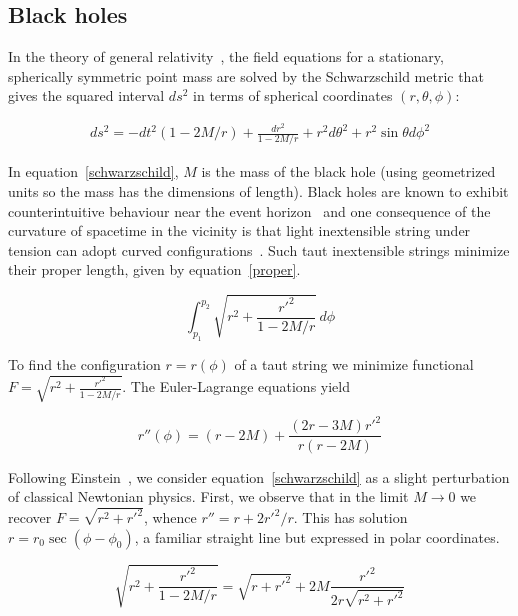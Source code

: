 \documentclass[pdflatex,sn-mathphys-num]{sn-jnl}%
\theoremstyle{thmstyleone}%
\theoremstyle{thmstyletwo}%
\theoremstyle{thmstylethree}%
\begin{document}
\subsection{Black holes}

In the theory of general relativity~\cite{misner1973}, the field
equations for a stationary, spherically symmetric point mass are
solved by the Schwarzschild metric that gives the squared interval
$ds^2$ in terms of spherical coordinates $(r,\theta,\phi)$:

\begin{eqnarray}\label{schwarzschild}
  ds^2=
  -dt^2(1-2M/r) + \frac{dr^2}{1-2M/r} + r^2d\theta^2 + r^2\sin\theta d\phi^2
  \end{eqnarray}

In equation~\ref{schwarzschild}, $M$ is the mass of the black hole
(using geometrized units so the mass has the dimensions of length).
Black holes are known to exhibit counterintuitive behaviour near the
event horizon~\cite{allen1990} and one consequence of the
curvature of spacetime in the vicinity is that light inextensible
string under tension can adopt curved
configurations~\cite{hankin2021}.  Such taut inextensible strings
minimize their proper length, given by equation~\ref{proper}.

\begin{equation}\label{proper}
  \int_{p_1}^{p_2}\sqrt{r^2 + \frac{r'^2}{1-2M/r}}\,d\phi
\end{equation}

To find the configuration $r=r(\phi)$ of a taut string we minimize
functional $F=\sqrt{r^2 + \frac{r'^2}{1-2M/r}}$.  The Euler-Lagrange
equations yield

\begin{equation}\label{eulerstring}
  r''(\phi) = (r-2M) + \frac{(2r-3M)r'^2}{r(r-2M)}
\end{equation}


Following Einstein~\cite{einstein1915}, we consider
equation~\ref{schwarzschild} as a slight perturbation of classical
Newtonian physics.  First, we observe that in the limit
$M\longrightarrow 0$ we recover $F=\sqrt{r^2+r'^2}$, whence $r'' = r +
2r'^2/r$.  This has solution $r=r_0\sec(\phi-\phi_0)$, a familiar
straight line but expressed in polar coordinates.

\begin{equation}
\sqrt{r^2 + \frac{r'^2}{1-2M/r}}=\sqrt{r+r'^2} + 2M\frac{r'^2}{2r\sqrt{r^2 + r'^2}}
\end{equation}
  
\end{document}
